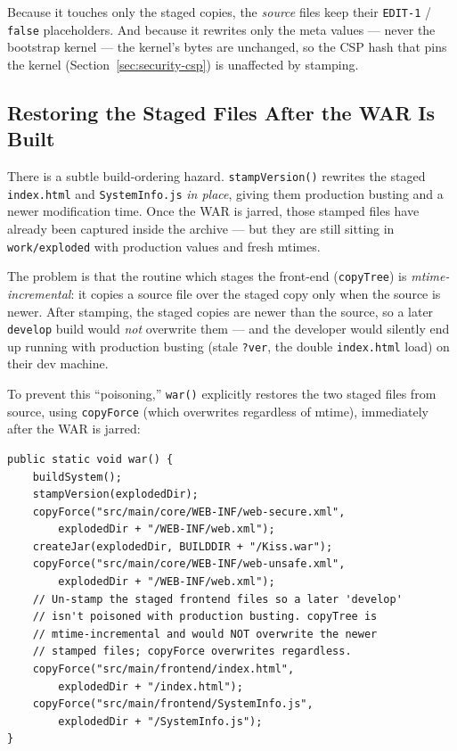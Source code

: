 \noindent
Because it touches only the staged copies, the \emph{source} files keep their \texttt{EDIT-1} / \texttt{false} placeholders.  And because it rewrites only the meta values --- never the bootstrap kernel --- the kernel's bytes are unchanged, so the CSP hash that pins the kernel (Section~\ref{sec:security-csp}) is unaffected by stamping.

\subsection{Restoring the Staged Files After the WAR Is Built}
\label{sec:cache-war-restore}

There is a subtle build-ordering hazard.  \texttt{stampVersion()} rewrites the staged \texttt{index.html} and \texttt{SystemInfo.js} \emph{in place}, giving them production busting and a newer modification time.  Once the WAR is jarred, those stamped files have already been captured inside the archive --- but they are still sitting in \texttt{work/exploded} with production values and fresh mtimes.

The problem is that the routine which stages the front-end (\texttt{copyTree}) is \emph{mtime-incremental}: it copies a source file over the staged copy only when the source is newer.  After stamping, the staged copies are newer than the source, so a later \texttt{develop} build would \emph{not} overwrite them --- and the developer would silently end up running with production busting (stale \texttt{?ver}, the double \texttt{index.html} load) on their dev machine.

To prevent this ``poisoning,'' \texttt{war()} explicitly restores the two staged files from source, using \texttt{copyForce} (which overwrites regardless of mtime), immediately after the WAR is jarred:

\begin{lstlisting}[style=java]
public static void war() {
    buildSystem();
    stampVersion(explodedDir);
    copyForce("src/main/core/WEB-INF/web-secure.xml",
        explodedDir + "/WEB-INF/web.xml");
    createJar(explodedDir, BUILDDIR + "/Kiss.war");
    copyForce("src/main/core/WEB-INF/web-unsafe.xml",
        explodedDir + "/WEB-INF/web.xml");
    // Un-stamp the staged frontend files so a later 'develop'
    // isn't poisoned with production busting. copyTree is
    // mtime-incremental and would NOT overwrite the newer
    // stamped files; copyForce overwrites regardless.
    copyForce("src/main/frontend/index.html",
        explodedDir + "/index.html");
    copyForce("src/main/frontend/SystemInfo.js",
        explodedDir + "/SystemInfo.js");
}
\end{lstlisting}

